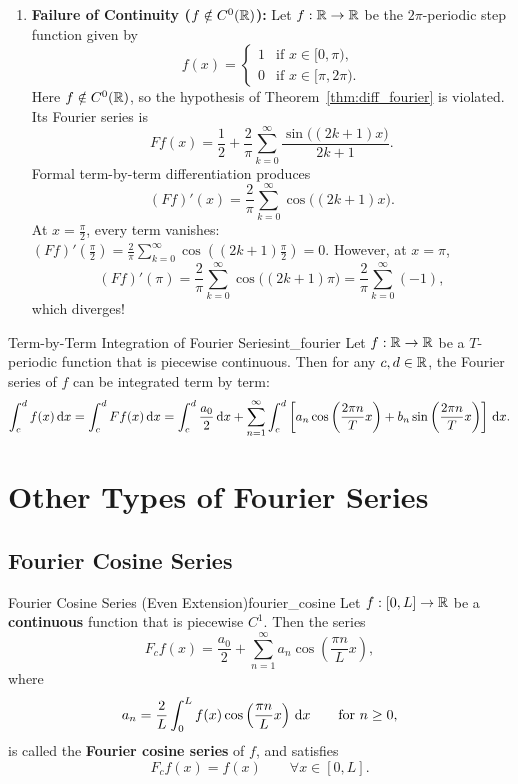 \begin{exemple}
\begin{enumerate}
        \item[(b)] \textbf{Failure of Continuity ($f \notin C^0(\mathbb{R})$):} Let $f : \mathbb{R} \to \mathbb{R}$ be the $2\pi$-periodic step function given by
        \[
            f(x) =
            \begin{cases}
                1 & \text{if } x \in [0, \pi), \\
                0 & \text{if } x \in [\pi, 2\pi).
            \end{cases}
        \]
        Here $f \notin C^0(\mathbb{R})$, so the hypothesis of Theorem~\ref{thm:diff_fourier} is violated. Its Fourier series is
        \[
            Ff(x) = \frac{1}{2} + \frac{2}{\pi} \sum_{k=0}^{\infty} \frac{\sin\big((2k+1)x\big)}{2k+1}.
        \]
        Formal term-by-term differentiation produces
        \[
            (Ff)'(x) = \frac{2}{\pi} \sum_{k=0}^{\infty} \cos\big((2k+1)x\big).
        \]
        At $x = \frac{\pi}{2}$, every term vanishes: $(Ff)'\left(\frac{\pi}{2}\right) = \frac{2}{\pi} \sum_{k=0}^{\infty} \cos\left((2k+1)\frac{\pi}{2}\right) = 0$. However, at $x = \pi$,
        \[
            (Ff)'(\pi) = \frac{2}{\pi} \sum_{k=0}^{\infty} \cos\big((2k+1)\pi\big) = \frac{2}{\pi} \sum_{k=0}^{\infty} (-1),
        \]
        which diverges!
    \end{enumerate}
\end{exemple}

\begin{theoreme}{Term-by-Term Integration of Fourier Series}{int_fourier}
    Let $f : \mathbb{R} \to \mathbb{R}$ be a $T$-periodic function that is piecewise continuous. Then for any $c, d \in \mathbb{R}$, the Fourier series of $f$ can be integrated term by term:
    \[
        \int_{c}^{d} f(x) \,\mathrm{d}x = \int_{c}^{d} Ff(x) \,\mathrm{d}x = \int_{c}^{d} \frac{a_0}{2} \,\mathrm{d}x + \sum_{n=1}^{\infty} \int_{c}^{d} \left[ a_n \cos\left(\frac{2\pi n}{T} x\right) + b_n \sin\left(\frac{2\pi n}{T} x\right) \right] \,\mathrm{d}x.
    \]
\end{theoreme}

\section{Other Types of Fourier Series}

\subsection{Fourier Cosine Series}

\begin{theoreme}{Fourier Cosine Series (Even Extension)}{fourier_cosine}
    Let $f : [0, L] \to \mathbb{R}$ be a \textbf{continuous} function that is piecewise $C^1$. Then the series
    \[
        F_c f(x) = \frac{a_0}{2} + \sum_{n=1}^{\infty} a_n \cos\left(\frac{\pi n}{L} x\right),
    \]
    where
    \[
        a_n = \frac{2}{L} \int_{0}^{L} f(x) \cos\left(\frac{\pi n}{L} x\right) \,\mathrm{d}x \qquad \text{for } n \ge 0,
    \]
    is called the \textbf{Fourier cosine series} of $f$, and satisfies
    \[
        F_c f(x) = f(x) \qquad \forall x \in [0, L].
    \]
\end{theoreme}
